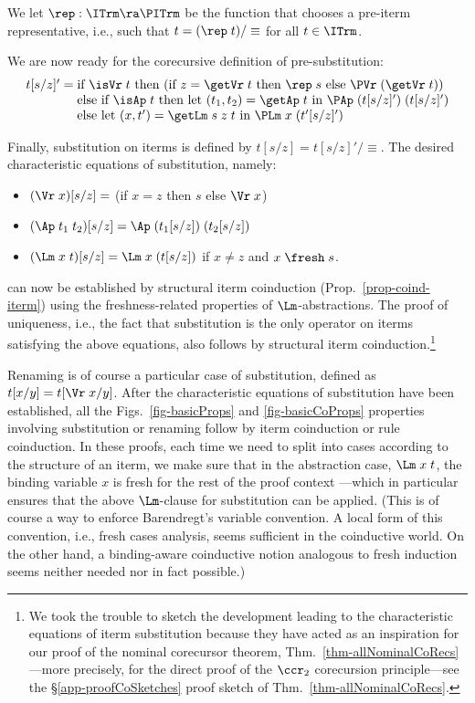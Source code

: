 We  let $\rep: \ITrm \ra \PITrm$ be the function that chooses a pre-iterm representative, i.e., such that $t = (\rep\;t)/\equiv$ for all $t\in\ITrm$. 

We are now ready for the corecursive definition of pre-substitution: 
%
$$
\begin{array}{l}
t[s / z]' = 
\mbox{if $\isVr\;t$ then (if $z = \getVr\;t$ then $\rep\;s$ else $\PVr\;(\getVr\;t)$)}
\\\phantom{t[s / z]' = \;} 
\mbox{else if $\isAp\;t$ then let $(t_1,t_2) = \getAp\;t$ in 
	$\PAp\;(t[s / z]' )\;(t[s / z]')$}
\\\phantom{t[s / z]' = \;} 
\mbox{else let $(x,t') = \getLm\;s\;z\;t$ in 
	$\PLm\;x\;(t'[s / z]' )$}
\end{array} 
$$

Finally, substitution on iterms is defined by $t[s / z] = t[s / z]'/\equiv$. 
The desired characteristic equations of substitution, namely:
\begin{itemize}
	\item $(\Vr\;x)[s/z] = $ (if $x = z$ then $s$ else $\Vr\;x$)
	\item $(\Ap\;t_1\;t_2)[s/z] = \Ap\;(t_1[s/z])\;(t_2[s/z])$ 
	\item $(\Lm\;x\;t)[s/z] = \Lm\;x\;(t[s/z])$ if $x\not= z$ and $x\;\fresh\;s$. 
\end{itemize}
can now be established by structural iterm coinduction (Prop.~\ref{prop-coind-iterm}) 
using the freshness-related properties of $\Lm$-abstractions.  
The proof of uniqueness, i.e., the fact that substitution is the only operator on iterms satisfying the above equations, also follows by structural iterm coinduction.\footnote{We took the trouble to sketch the development leading to the characteristic equations of iterm substitution because they have acted as an inspiration for our proof of the nominal corecursor theorem, Thm.~\ref{thm-allNominalCoRecs}---more precisely, for the direct proof of the $\ccr_2$ corecursion principle---see the \S\ref{app-proofCoSketches} proof sketch of Thm.~\ref{thm-allNominalCoRecs}.}

\medskip 
Renaming is of course a particular case of substitution, defined as 
$t[x/y] = t[\Vr\;x/y]$. After the characteristic equations of substitution have been established, all the Figs.~\ref{fig-basicProps} and \ref{fig-basicCoProps} properties involving substitution or renaming follow by iterm coinduction or rule coinduction. In these proofs, each time we need to split into cases according to the structure of an iterm, we make sure that in the abstraction case, $\Lm\;x\;t$, the binding variable $x$ is fresh for the rest of the proof context%
---which in particular ensures that the above $\Lm$-clause for substitution can be applied. (This is of course a way to enforce Barendregt's variable convention. A local form of this convention, i.e., fresh cases analysis, seems sufficient in the coinductive world. On the other hand, a binding-aware coinductive notion analogous to fresh induction seems neither needed nor in fact possible.)


